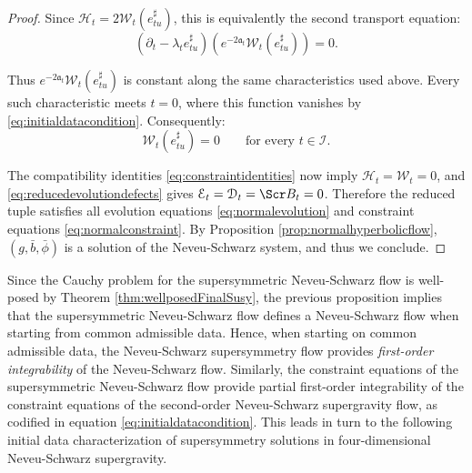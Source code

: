 \documentclass[10pt,reqno,a4paper]{amsart}
\theoremstyle{plain}
\theoremstyle{definition}
\theoremstyle{remark}
\theoremstyle{remark}
\def\cB{\Scr B}
\def\cH{\mathcal{H}}
\def\cD{\mathcal{D}}
\def\cE{\mathcal{E}}
\def\cI{\mathcal{I}}
\def\cW{\mathcal{W}}
\def\cH{\mathcal{H}}
\def\fra{\mathfrak{a}}
\renewcommand{\(}{ (}
\renewcommand{\)}{ )}
\begin{document}
\begin{proof}
\noindent
Since $\cH_t=2\cW_t(e^{\sharp}_{tu})$, this is equivalently the second transport equation:
\begin{equation}
\label{eq:momentumconstrainttransport}
 (\partial_t-\lambda_t e^{\sharp}_{tu} )
 (e^{-2\fra_t}\cW_t(e^{\sharp}_{tu}) )=0.
\end{equation}

\noindent
Thus $e^{-2\fra_t}\cW_t(e^{\sharp}_{tu})$ is constant along the same characteristics used above. Every such characteristic meets $t=0$, where this function vanishes by \eqref{eq:initialdatacondition}. Consequently:
\begin{equation*}
\cW_t(e^{\sharp}_{tu})=0
\qquad\text{for every }t\in\cI.
\end{equation*}

\noindent
The compatibility identities \eqref{eq:constraintidentities} now imply $\cH_t=\cW_t=0$, and \eqref{eq:reducedevolutiondefects} gives $\cE_t=\cD_t=\cB_t=0$. Therefore the reduced tuple satisfies all evolution equations
\eqref{eq:normalevolution} and constraint equations \eqref{eq:normalconstraint}. By Proposition \ref{prop:normalhyperbolicflow}, $(g,\bar{b},\bar{\phi})$ is a solution of the Neveu-Schwarz system, and thus we conclude.
\end{proof}  

\noindent
Since the Cauchy problem for the supersymmetric Neveu-Schwarz flow is well-posed by Theorem \ref{thm:wellposedFinalSusy}, the previous proposition implies that the supersymmetric Neveu-Schwarz flow defines a Neveu-Schwarz flow when starting from common admissible data. Hence, when starting on common admissible data, the Neveu-Schwarz supersymmetry flow provides \emph{first-order integrability} of the Neveu-Schwarz flow. Similarly, the constraint equations of the supersymmetric Neveu-Schwarz flow provide partial first-order integrability of the constraint equations of the second-order Neveu-Schwarz supergravity flow, as codified in equation \eqref{eq:initialdatacondition}. This leads in turn to the following initial data characterization of supersymmetry solutions in four-dimensional Neveu-Schwarz supergravity.
\end{document}
